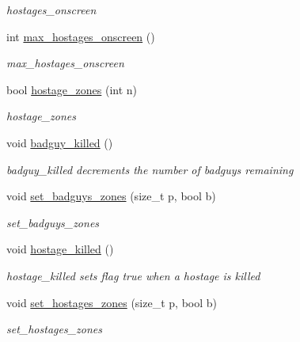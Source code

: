 \begin{DoxyCompactItemize}
\begin{DoxyCompactList}\small\item\em hostages\+\_\+onscreen \end{DoxyCompactList}\item 
int \hyperlink{class_game_abceb2d7ac9209b6ff3a2e2b4d727f05d}{max\+\_\+hostages\+\_\+onscreen} ()
\begin{DoxyCompactList}\small\item\em max\+\_\+hostages\+\_\+onscreen \end{DoxyCompactList}\item 
bool \hyperlink{class_game_a90b2ca46a8e37e5a64a9bdce3f4a3e4b}{hostage\+\_\+zones} (int n)
\begin{DoxyCompactList}\small\item\em hostage\+\_\+zones \end{DoxyCompactList}\item 
\hypertarget{class_game_a7406d3975dff0cba5c50115d0f050a45}{}void \hyperlink{class_game_a7406d3975dff0cba5c50115d0f050a45}{badguy\+\_\+killed} ()\label{class_game_a7406d3975dff0cba5c50115d0f050a45}

\begin{DoxyCompactList}\small\item\em badguy\+\_\+killed decrements the number of badguys remaining \end{DoxyCompactList}\item 
void \hyperlink{class_game_ab4807ffbf5ec48e829789fb3390518f1}{set\+\_\+badguys\+\_\+zones} (size\+\_\+t p, bool b)
\begin{DoxyCompactList}\small\item\em set\+\_\+badguys\+\_\+zones \end{DoxyCompactList}\item 
\hypertarget{class_game_a080d1ee7b8efcef5834ffec80e0bbdb1}{}void \hyperlink{class_game_a080d1ee7b8efcef5834ffec80e0bbdb1}{hostage\+\_\+killed} ()\label{class_game_a080d1ee7b8efcef5834ffec80e0bbdb1}

\begin{DoxyCompactList}\small\item\em hostage\+\_\+killed sets flag true when a hostage is killed \end{DoxyCompactList}\item 
void \hyperlink{class_game_ac574b8c3b5287af87d780447c8f34840}{set\+\_\+hostages\+\_\+zones} (size\+\_\+t p, bool b)
\begin{DoxyCompactList}\small\item\em set\+\_\+hostages\+\_\+zones \end{DoxyCompactList}\end{DoxyCompactItemize}
